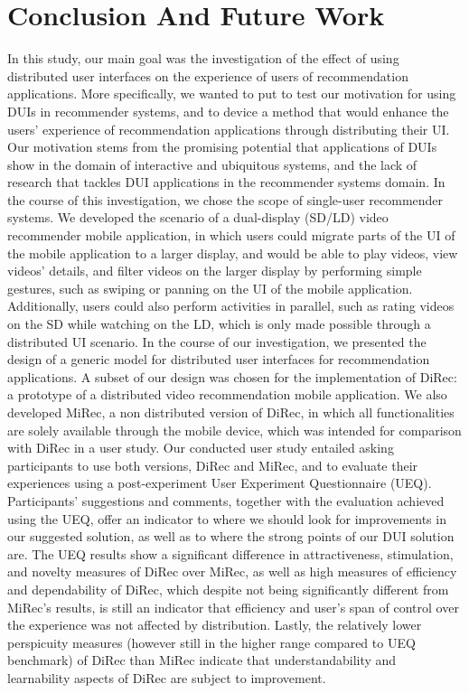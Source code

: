 \chapter{Conclusion And Future Work}\label{chapter:conc}
In this study, our main goal was the investigation of the effect of using
distributed user interfaces on the experience of users of recommendation
applications. More specifically, we wanted to put to test our motivation for
using DUIs in recommender systems, and to device a method that would enhance the
users' experience of recommendation applications through distributing their UI.
Our motivation stems from the promising potential that applications of DUIs show in the domain of interactive and
ubiquitous systems, and the lack of research that tackles DUI applications in
the recommender systems domain. In the course of this investigation, we chose
the scope of single-user recommender systems.  We developed the scenario of a
dual-display (SD/LD) video recommender mobile application, in which users could
migrate parts of the UI of the mobile application to a larger display, and would
be able to play videos, view videos' details, and filter videos on the larger
display by performing simple gestures, such as swiping or panning on the UI of
the mobile application. Additionally, users could also perform activities in
parallel, such as rating videos on the SD while watching on the LD, which is
only made possible through a distributed UI scenario. In the course of our
investigation, we presented the design of a generic model for distributed user interfaces for recommendation applications. A subset of our design was chosen for the implementation of DiRec:
a prototype of a distributed video recommendation mobile application.
We also developed MiRec, a non distributed version of DiRec, in which all
functionalities are solely available through the mobile device, which was
intended for comparison with DiRec in a user study.
Our conducted user study entailed asking participants to use both versions, DiRec and MiRec, and to evaluate their experiences using a post-experiment User Experiment Questionnaire (UEQ). Participants' suggestions
and comments, together with the evaluation achieved using the UEQ, offer an
indicator to where we should look for improvements in our suggested solution, as
well as to where the strong points of our DUI solution are. The UEQ results show
a significant difference in attractiveness, stimulation, and novelty measures of
DiRec over MiRec, as well as high measures of efficiency and dependability of
DiRec, which despite not being significantly different from MiRec's results, is
still an indicator that efficiency and user's span of control over the
experience was not affected by distribution. Lastly, the relatively lower perspicuity
measures (however still in the higher range compared to UEQ benchmark) of DiRec
than MiRec indicate that understandability and learnability aspects of DiRec are
subject to improvement.
